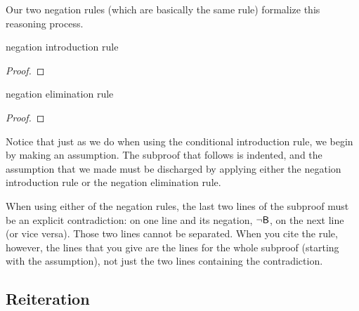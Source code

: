 Our two negation rules (which are basically the same rule) formalize this reasoning process.

\medskip
\begin{tcbraster}[raster columns=2, raster valign=top]
\begin{factboxy}{negation introduction rule}
\begin{proof}
\open
	\as{}
\close
{}
\end{proof}
\end{factboxy}
\begin{factboxy}{negation elimination rule}
\begin{proof}
\open
	\as{}
\close
{}
\end{proof}
\end{factboxy}
\end{tcbraster}
\medskip

\noindent Notice that just as we do when using the conditional introduction rule, we begin by making an assumption. The subproof that follows is indented, and the assumption that we made must be discharged by applying either the negation introduction rule or the negation elimination rule. 

When using either of the negation rules, the last two lines of the subproof must be an explicit contradiction:  on one line and its negation, ${\neg}\mathsf{B}$, on the next line (or vice versa). Those two lines cannot be separated. When you cite the rule, however, the lines that you give are the lines for the whole subproof (starting with the assumption), not just the two lines containing the contradiction. 



\subsection{Reiteration}

